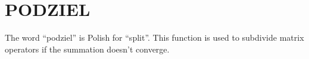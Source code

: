 \section{PODZIEL}
\label{sect:podziel}

\noindent The word ``podziel'' is Polish for ``split''. This function is
used to subdivide matrix operators if the summation doesn't converge.\\

